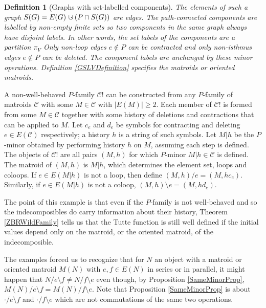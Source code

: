 \documentclass[12pt,leqno]{amsart}
\newtheorem{definition}[lem]{Definition}
\theoremstyle{remark}
\newcommand{\dunion}
{\mbox{\hbox{\hskip6pt$\cdot$\hskip-5.50pt$\cup$\hskip2pt}}}
\begin{document}
\begin{definition}[Graphs with set-labelled components]
\label{GSLCDefinition}
The elements of such a graph $S(G)=E(G)\dunion(P\cap S(G))$ are edges.
The path-connected components are labelled by
non-empty finite sets so two components in the same
graph always have disjoint labels.  In other words,
the set labels of the components are a partition $\pi_V$
Only non-loop edges $e\not\in P$
can be contracted and only non-isthmus edges 
$e\not\in P$
can be deleted.
The component labels are unchanged by these minor operations.
Definition \ref{GSLVDefinition} specifies the
matroids or oriented matroids.
\end{definition}


A non-well-behaved $P$-family $\mathcal{C}!$
can be constructed from
any $P$-family of matroids $\mathcal{C}$ with
some $M\in\mathcal{C}$ with $|E(M)|\geq 2$.  
Each member of $\mathcal{C}!$ is formed from
some $M\in\mathcal{C}$ together with some
history of deletions and contractions that
can be applied to $M$.  Let $c_e$ and $d_e$ be symbols
for contracting and deleting $e\in E(\mathcal{C})$
respectively; a history $h$ is a string of
such symbols.  
Let $M|h$ be the $P$-minor obtained by 
performing history $h$ on $M$, assuming each step
is defined.  The objects of $\mathcal{C}!$
are all pairs $(M,h)$ for which 
$P$-minor $M|h\in\mathcal{C}$ is defined.
The matroid of $(M,h)$ is $M|h$, which
determines the element set, loops and coloops.
If $e\in E(M|h)$ is not
a loop, then define $(M,h)/e=(M,hc_e)$.
Similarly, if $e\in E(M|h)$ is not
a coloop, $(M,h)\setminus e=(M,hd_e)$.

The point of this example is that even if
the $P$-family is not well-behaved and so the
indecomposibles do carry information about their
history, Theorem \ref{ZBRWildFamily} tells 
us that the Tutte function
is still well defined if the initial values depend only
on the matroid, or the oriented matroid, of the 
indecomposible.


The examples forced us to recognize that
for $N$ an object with a matroid or oriented matroid $M(N)$
with
${e,f}\in E(N)$ in series or in parallel,  it might
happen that $N/e\setminus f\neq N/f\setminus e$ even though,
by Proposition \ref{SameMinorProp}, 
$M(N)/e\setminus f= M(N)/f\setminus e$.  Note that 
Proposition \ref{SameMinorProp} is about 
$\cdot/e\setminus f$ and 
$\cdot/f\setminus e$ which are not commutations
of the same two operations.
\end{document}
